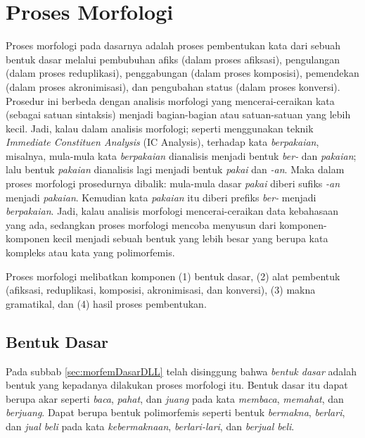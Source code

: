 \section{Proses Morfologi}
\label{sec:prosesMorfologi}

Proses morfologi pada dasarnya adalah proses pembentukan kata dari sebuah bentuk dasar melalui pembubuhan afiks (dalam proses afiksasi), pengulangan (dalam proses reduplikasi), penggabungan (dalam proses komposisi), pemendekan (dalam proses akronimisasi), dan pengubahan status (dalam proses konversi)\cite{chaer:08:morfologi}. Prosedur ini berbeda dengan analisis morfologi yang mencerai-ceraikan kata (sebagai satuan sintaksis) menjadi bagian-bagian atau satuan-satuan yang lebih kecil. Jadi, kalau dalam analisis morfologi; seperti menggunakan teknik \textit{Immediate Constituen Analysis} (IC Analysis), terhadap kata \textit{berpakaian}, misalnya, mula-mula kata \textit{berpakaian} dianalisis menjadi bentuk \textit{ber-} dan \textit{pakaian}; lalu bentuk \textit{pakaian} dianalisis lagi menjadi bentuk \textit{pakai} dan \textit{-an}. Maka dalam proses morfologi prosedurnya dibalik: mula-mula dasar \textit{pakai} diberi sufiks \textit{-an} menjadi \textit{pakaian}. Kemudian kata \textit{pakaian} itu diberi prefiks \textit{ber-} menjadi \textit{berpakaian}. Jadi, kalau analisis morfologi mencerai-ceraikan data kebahasaan yang ada, sedangkan proses morfologi mencoba menyusun dari komponen-komponen kecil menjadi sebuah bentuk yang lebih besar yang berupa kata kompleks atau kata yang polimorfemis.

Proses morfologi melibatkan komponen (1) bentuk dasar, (2) alat pembentuk (afiksasi, reduplikasi, komposisi, akronimisasi, dan konversi), (3) makna gramatikal, dan (4) hasil proses pembentukan.


\subsection{Bentuk Dasar}
\label{sec:bentukDasar}

Pada subbab \ref{sec:morfemDasarDLL} telah disinggung bahwa \textit{bentuk dasar} adalah bentuk yang kepadanya dilakukan proses morfologi itu. Bentuk dasar itu dapat berupa akar seperti \textit{baca}, \textit{pahat}, dan \textit{juang} pada kata \textit{membaca}, \textit{memahat}, dan \textit{berjuang}. Dapat berupa bentuk polimorfemis seperti bentuk \textit{bermakna}, \textit{berlari}, dan \textit{jual beli} pada kata \textit{kebermaknaan}, \textit{berlari-lari}, dan \textit{berjual beli}.

